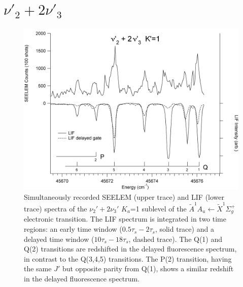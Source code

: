 \documentclass[12pt]{mitthesis}
\begin{document}
\section{$\nu'_2+2\nu'_3$}

\begin{figure}
  \caption{Simultaneously recorded SEELEM (upper trace) and LIF (lower
    trace) spectra of the $\nu_2'+2\nu_3'$ $K_a$=1 sublevel of the
    $\tilde{A}^1A_u \leftarrow \tilde{X} ^1\Sigma_g^+$ electronic
    transition.  The LIF spectrum is integrated in two time regions:
    an early time window ($0.5\tau_s-2\tau_s$, solid trace) and a
    delayed time window ($10\tau_s-18\tau_s$, dashed trace).  The
    Q(1) and Q(2) transitions are redshifted in the delayed
    fluorescence spectrum, in contrast to the Q(3,4,5) transitions.
    The P(2) transition, having the same $J'$ but opposite parity from
    Q(1), shows a similar redshift in the delayed fluorescence
    spectrum.}
  \label{fig:spectrum-2132}
  \centering
  \vspace{1cm}
  \includegraphics[width=7in,angle=90]{acetylene-2132-q6q1.png}
\end{figure}
\end{document}
